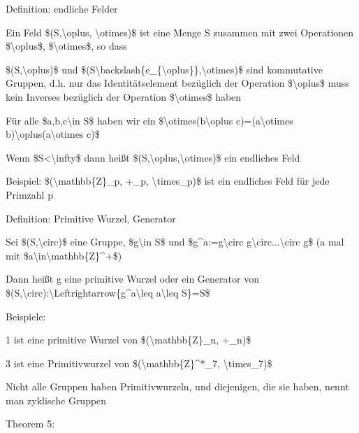 \documentclass[a4paper]{article}
\begin{document}
\begin{multicols}{3}
\begin{itemize*}
            \begin{itemize*}
                  \item Definition: endliche Felder
                  \begin{itemize*} \item Ein Feld \$(S,\textbackslash oplus, \textbackslash otimes)\$ ist eine Menge S zusammen mit zwei Operationen \$\textbackslash oplus\$, \$\textbackslash otimes\$, so dass
                        \begin{itemize*} \item \$(S,\textbackslash oplus)\$ und \$(S\textbackslash backslash\{e\_\{\textbackslash oplus\}\},\textbackslash otimes)\$ sind kommutative Gruppen, d.h. nur das Identitätselement bezüglich der Operation \$\textbackslash oplus\$ muss kein Inverses bezüglich der Operation \$\textbackslash otimes\$ haben \item Für alle \$a,b,c\textbackslash in S\$ haben wir ein \$\textbackslash otimes(b\textbackslash oplus c)=(a\textbackslash otimes b)\textbackslash oplus(a\textbackslash otimes c)\$ \end{itemize*} \end{itemize*}
                  \item Wenn \$\textbar S\textbar\textless\textbackslash infty\$ dann heißt \$(S,\textbackslash oplus,\textbackslash otimes)\$ ein endliches Feld
            \end{itemize*}
            \item
            Beispiel: \$(\textbackslash mathbb\{Z\}\_p, +\_p,
            \textbackslash times\_p)\$ ist ein endliches Feld für jede Primzahl p
            \item
            Definition: Primitive Wurzel, Generator

            \begin{itemize*}
                  \item Sei \$(S,\textbackslash circ)\$ eine Gruppe, \$g\textbackslash in S\$ und \$g\^{}a:=g\textbackslash circ g\textbackslash circ...\textbackslash circ g\$ (a mal mit \$a\textbackslash in\textbackslash mathbb\{Z\}\^{}+\$)
                  \item Dann heißt g eine primitive Wurzel oder ein Generator von \$(S,\textbackslash circ):\textbackslash Leftrightarrow\{g\^{}a\textbackslash leq a\textbackslash leq \textbar S\textbar\}=S\$
                  \item Beispiele:
                  \begin{itemize*} \item 1 ist eine primitive Wurzel von \$(\textbackslash mathbb\{Z\}\_n, +\_n)\$ \item 3 ist eine Primitivwurzel von \$(\textbackslash mathbb\{Z\}\^{}*\_7, \textbackslash times\_7)\$ \end{itemize*}
                  \item Nicht alle Gruppen haben Primitivwurzeln, und diejenigen, die sie haben, nennt man zyklische Gruppen
            \end{itemize*}
            \item
            Theorem 5:


\end{itemize*}
\end{multicols}
\end{document}
